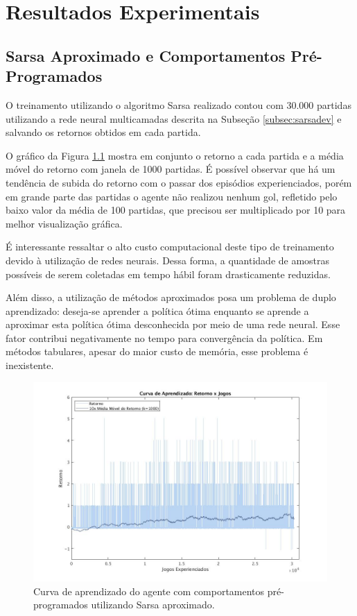 \chapter{Resultados Experimentais}
\label{chap:Resultados}





\section{Sarsa Aproximado e Comportamentos Pré-Programados}

O treinamento utilizando o algoritmo Sarsa realizado contou com 30.000 partidas utilizando a rede neural multicamadas descrita na Subseção \ref{subsec:sarsadev} e salvando os retornos obtidos em cada partida.

O gráfico da Figura \ref{fig:single-agent-sarsa-behaviors} mostra em conjunto o retorno a cada partida e a média móvel do retorno com janela de 1000 partidas. É possível observar que há um tendência de subida do retorno com o passar dos episódios experienciados, porém em grande parte das partidas o agente não realizou nenhum gol, refletido pelo baixo valor da média de 100 partidas, que precisou ser multiplicado por 10 para melhor visualização gráfica.

É interessante ressaltar o alto custo computacional deste tipo de treinamento devido à utilização de redes neurais. Dessa forma, a quantidade de amostras possíveis de serem coletadas em tempo hábil foram drasticamente reduzidas.

Além disso, a utilização de métodos aproximados posa um problema de duplo aprendizado: deseja-se aprender a política ótima enquanto se aprende a aproximar esta política ótima desconhecida por meio de uma rede neural. Esse fator contribui negativamente no tempo para convergência da política. Em métodos tabulares, apesar do maior custo de memória, esse problema é inexistente.

\begin{figure}[H]
	\includegraphics[width=0.9\linewidth]{figs/curva-sarsa-1.jpg}
	\centering
	\caption{Curva de aprendizado do agente com comportamentos pré-programados utilizando Sarsa aproximado.}
	\label{fig:single-agent-sarsa-behaviors}
\end{figure}

